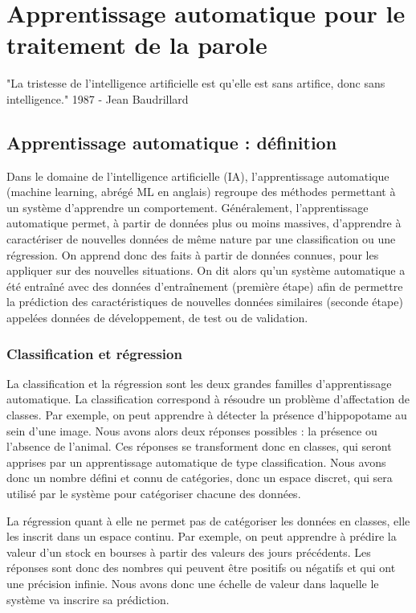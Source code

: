 \chapter{Apprentissage automatique pour le traitement de la parole}
"La tristesse de l'intelligence artificielle est qu'elle est sans artifice, donc sans intelligence." 1987 -
Jean Baudrillard

\section{Apprentissage automatique : définition}

Dans le domaine de l'intelligence artificielle (IA), l'apprentissage automatique (machine learning, abrégé ML en anglais) regroupe des méthodes permettant à un système d'apprendre un comportement. Généralement, l'apprentissage automatique permet, à partir de données plus ou moins massives, d'apprendre à caractériser de nouvelles données de même nature par une classification ou une régression. On apprend donc des faits à partir de données connues, pour les appliquer sur des nouvelles situations. On dit alors qu'un système automatique a été entraîné avec des données d’entraînement (première étape) afin de permettre la prédiction des caractéristiques de nouvelles données similaires (seconde étape) appelées données de développement, de test ou de validation.


\subsection{Classification et régression}
La classification et la régression sont les deux grandes familles d'apprentissage automatique.
La classification correspond à résoudre un problème d'affectation de classes. Par exemple, on peut apprendre à détecter la présence d'hippopotame au sein d'une image. Nous avons alors deux réponses possibles : la présence ou l'absence de l'animal. Ces réponses se transforment donc en classes, qui seront apprises par un apprentissage automatique de type classification. Nous avons donc un nombre défini et connu de catégories, donc un espace discret, qui sera utilisé par le système pour catégoriser chacune des données.

La régression quant à elle ne permet pas de catégoriser les données en classes, elle les inscrit dans un espace continu. Par exemple, on peut apprendre à  prédire la valeur d'un stock en bourses à partir des valeurs des jours précédents. Les réponses sont donc des nombres qui peuvent être positifs ou négatifs et qui ont une précision infinie. Nous avons donc une échelle de valeur dans laquelle le système va inscrire sa prédiction.

